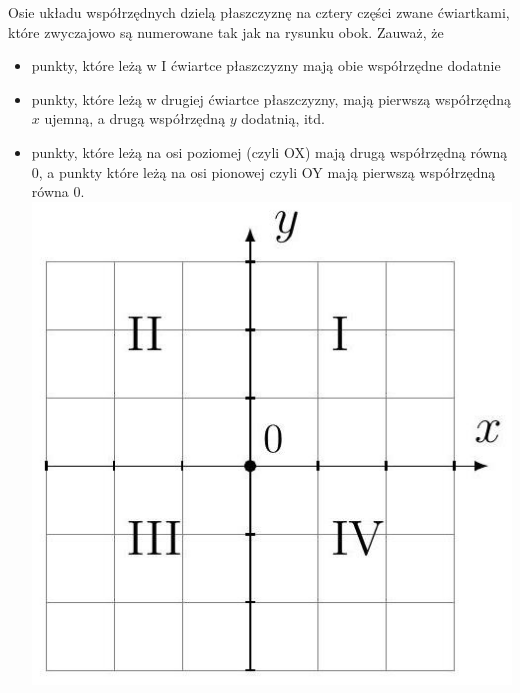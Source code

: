 \documentclass[10pt]{article}
\begin{document}
Osie układu współrzędnych dzielą płaszczyznę na cztery części zwane ćwiartkami, które zwyczajowo są numerowane tak jak na rysunku obok. Zauważ, że

\begin{itemize}
  \item punkty, które leżą w I ćwiartce płaszczyzny mają obie współrzędne dodatnie
  \item punkty, które leżą w drugiej ćwiartce płaszczyzny, mają pierwszą współrzędną \(x\) ujemną, a drugą współrzędną \(y\) dodatnią, itd.
  \item punkty, które leżą na osi poziomej (czyli OX) mają drugą współrzędną równą 0, a punkty które leżą na osi pionowej czyli OY mają pierwszą współrzędną równa 0.\\
\includegraphics[max width=\textwidth, center]{2024_11_21_8f01584889ff06348ae7g-065}
\end{itemize}
\end{document}
